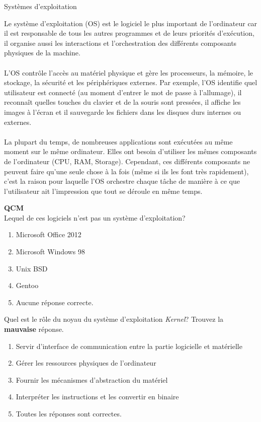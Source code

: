 \begin{section}{Systèmes d'exploitation}
    
Le système d'exploitation (OS) est le logiciel le plus important de l'ordinateur car il est responsable de tous les autres programmes et de leurs priorités d'exécution, il organise aussi les interactions et l'orchestration des différents composants physiques de la machine.
\\\\
L'OS contrôle l'accès au matériel physique et gère les processeurs, la mémoire, le stockage, la sécurité et les périphériques externes. Par exemple, l'OS identifie quel utilisateur est connecté (au moment d'entrer le mot de passe à l'allumage), il reconnaît quelles touches du clavier et de la souris sont pressées, il affiche les images à l'écran et il sauvegarde les fichiers dans les disques durs internes ou externes.
\\\\
La plupart du temps, de nombreuses applications sont exécutées au même moment sur le même ordinateur. Elles ont besoin d'utiliser les mêmes composants de l'ordinateur (CPU, RAM, Storage). Cependant, ces différents composants ne peuvent faire qu'une seule chose à la fois (même si ils les font très rapidement), c'est la raison pour laquelle l'OS orchestre chaque tâche de manière à ce que l'utilisateur ait l'impression que tout se déroule en même temps.
\\

    \begin{Exercice}[5 minutes]  \textbf{QCM}\\
    Lequel de ces logiciels n'est pas un système d'exploitation?
        \begin{enumerate}
            \item Microsoft Office 2012
            \item Microsoft Windows 98
            \item Unix BSD
            \item Gentoo
            \item Aucune réponse correcte.
        \end{enumerate}
    \end{Exercice}

    \begin{Exercice}[5 minutes]
        Quel est le rôle du noyau du système d'exploitation \textit{Kernel}? Trouvez la \textbf{mauvaise} réponse.
        \begin{enumerate}
            \item Servir d'interface de communication entre la partie logicielle et matérielle
            \item Gérer les ressources physiques de l'ordinateur
            \item Fournir les mécanismes d'abstraction du matériel
            \item Interpréter les instructions et les convertir en binaire
            \item Toutes les réponses sont correctes.
        \end{enumerate}
    \end{Exercice}


\end{section}
